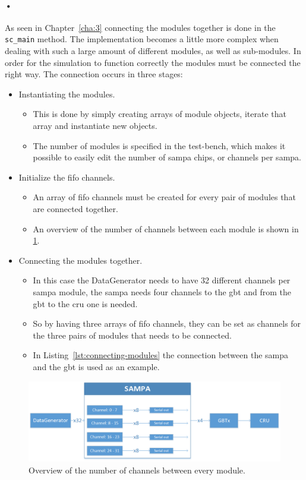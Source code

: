 \documentclass[a4paper, 12pt, openright, twoside]{report}
\newcommand{\codeword}[1]{\texttt{#1}}
\begin{document}
\paragraph{•}
As seen in Chapter~\ref{cha:3} connecting the modules together is done in the \codeword{sc\_main} method.
The implementation becomes a little more complex when dealing with such a large amount of different modules, as well as sub-modules.
In order for the simulation to function correctly the modules must be connected the right way.
The connection occurs in three stages:
\begin{itemize}
	\item Instantiating the modules.
		\begin{itemize}
			\item This is done by simply creating arrays of module objects, iterate that array and instantiate new objects.
			\item The number of modules is specified in the test-bench, which makes it possible to easily edit the number of \gls{sampa} chips, or channels per \gls{sampa}.
		\end{itemize}
	\item Initialize the \gls{fifo} channels.
		\begin{itemize}
			\item An array of \gls{fifo} channels must be created for every pair of modules that are connected together.
			\item An overview of the number of channels between each module is shown in \ref{fig:sampa-overview}.
		\end{itemize}
	\item Connecting the modules together.
		\begin{itemize}
			\item In this case the DataGenerator needs to have 32 different channels per \gls{sampa} module, the \gls{sampa} needs four channels to the \gls{gbt} and from the \gls{gbt} to the \gls{cru} one is needed.
			\item So by having three arrays of \gls{fifo} channels, they can be set as channels for the three pairs of modules that needs to be connected.
			\item In Listing~\ref{lst:connecting-modules} the connection between the \gls{sampa} and the \gls{gbt} is used as an example.
		\end{itemize}
\end{itemize}

\begin{figure}[h!]
	\centering
		\includegraphics[width=1.0\textwidth]{images/sampa-overview.png}
		\caption{Overview of the number of channels between every module.}
		\label{fig:sampa-overview}
\end{figure}
\end{document}
